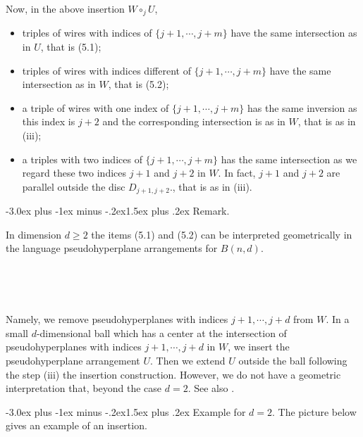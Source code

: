 \documentclass[12pt,a4paper]{article}
\makeatletter
\renewcommand{\subsection}{\@startsection{subsection}{2}{0pt}%
{-3.0ex plus -1ex minus -.2ex}{-1.5ex plus .2ex}%
{\normalfont\large\bf}}
\renewcommand{\subsection}{\@startsection{subsection}{2}{0pt}%
{-3.0ex plus -1ex minus -.2ex}{1.5ex plus .2ex}%
{\normalfont\large\bf}}
\renewcommand{\subsection}{\@startsection{subsection}{2}{0pt}%
{-3.0ex plus -1ex minus -.2ex}{-1.5ex plus .2ex}%
{\normalfont\normalsize\bf}}
\renewcommand{\subsection}{\@startsection{subsection}{2}{0pt}%
{-3.0ex plus -1ex minus -.2ex}{1.5ex plus .2ex}%
{\normalfont\normalsize\bf}}
\makeatother
\begin{document}
Now, in the above insertion $W\circ_j U$,

\begin{itemize}
\item
 triples of wires with indices of $\{j+1, \cdots, j+m\}$ have the same   intersection as in $U$, that is (5.1);
 
\item triples of wires with indices different of $\{j+1, \cdots, j+m\}$ have the same   intersection as in $W$, that is (5.2);

\item a triple of wires with one index of  $\{j+1, \cdots, j+m\}$ has the same inversion as this index is $j+2$  and the corresponding intersection is as in $W$, that is as in (iii);
\item a triples with two indices of  $\{j+1, \cdots, j+m\}$ has the same intersection as we regard these two indices $j+1$ and $j+2$ in $W$. In fact, $j+1$ and $j+2$ are parallel outside the disc $D_{j+1,j+2}$., that is as in (iii).

\end{itemize}

\subsection{Remark.} {In dimension $d\ge 2$ the items (5.1) and (5.2) can be interpreted geometrically in the language pseudohyperplane arrangements for $B(n,d)$.



\


\


Namely, we remove pseudohyperplanes with indices $j+1, \cdots , j+d$ from $W$. In a small $d$-dimensional ball which has a center at the intersection of pseudohyperplanes with indices $j+1, \cdots , j+d$ in $W$, we insert the pseudohyperplane arrangement $U$. Then we extend $U$ outside the ball following the step (iii)  the insertion construction. 
However, we do not have a geometric interpretation that, %
beyond the case $d=2$. See also \cite{Bash}.

} 
 \subsection{Example for $d = 2$.} The picture below gives an example of an insertion.   
 
\end{document}
